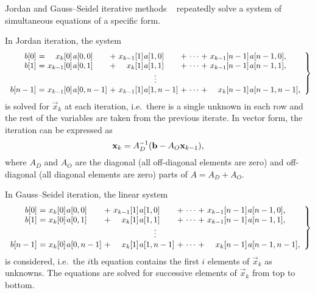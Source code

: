 Jordan and Gauss--Seidel iterative methods%
~\citep[Section~10.3.2--3]{stewart2009probability} repeatedly solve a
system of simultaneous equations of a specific form.

In Jordan iteration, the system
{\small\begin{equation} \left.
      \begin{array}{r@{${} = {}$}*{2}{r@{\kern1pt}l@{${} + {}$}}c@{${} + {}$}r@{\kern1pt}l}
        b[0] & x_{k}[0] & a[0,0] & x_{k - 1}[1] & a[1,0] & \cdots & x_{k - 1}[n - 1] & a[n - 1,0] \text,\\
        b[1] & x_{k - 1}[0] & a[0,1] & x_{k}[1] & a[1,1] & \cdots & x_{k - 1}[n - 1] & a[n - 1,1] \text,\\
        \multicolumn{8}{c}{$\vdots$} \\
        b[n - 1] & x_{k - 1}[0] & a[0,n - 1] & x_{k - 1}[1] & a[1,n - 1] & \cdots & x_{k}[n - 1] & a[n - 1,n - 1] \text,\\
      \end{array}
    \right\}
  \end{equation}}%
is solved for $\vec{x}_{k}$ at each iteration, i.e.~there is a
single unknown in each row and the rest of the variables are taken
from the previous iterate. In vector form, the iteration can be
expressed as
\begin{equation}
  \vec{x}_{k} = A_D^{-1} (\vec{b} - A_O \vec{x}_{k - 1}) \text,
\end{equation}
where $A_D$ and $A_O$ are the diagonal (all off-diagonal elements are
zero) and off-diagonal (all diagonal elements are zero) parts of $A =
A_D + A_O$.

In Gauss--Seidel iteration, the linear system
{\small\begin{equation}
    \left.
      \begin{array}{r@{${} = {}$}*{2}{r@{\kern1pt}l@{${} + {}$}}c@{${} + {}$}r@{\kern1pt}l}
        b[0] & x_{k}[0] & a[0,0] & x_{k - 1}[1] & a[1,0] & \cdots & x_{k - 1}[n - 1] & a[n - 1,0] \text,\\
        b[1] & x_{k}[0] & a[0,1] & x_{k}[1] & a[1,1] & \cdots & x_{k - 1}[n - 1] & a[n - 1,1] \text,\\
        \multicolumn{8}{c}{$\vdots$} \\
        b[n - 1] & x_{k}[0] & a[0,n - 1] & x_{k}[1] & a[1,n - 1] & \cdots & x_{k}[n - 1] & a[n - 1,n - 1] \text,\\
      \end{array}
    \right\}
  \end{equation}}%
is considered, i.e.~the $i$th equation contains the first $i$ elements
of $\vec{x}_k$ as unknowns. The equations are solved for successive
elements of $\vec{x}_k$ from top to bottom.

